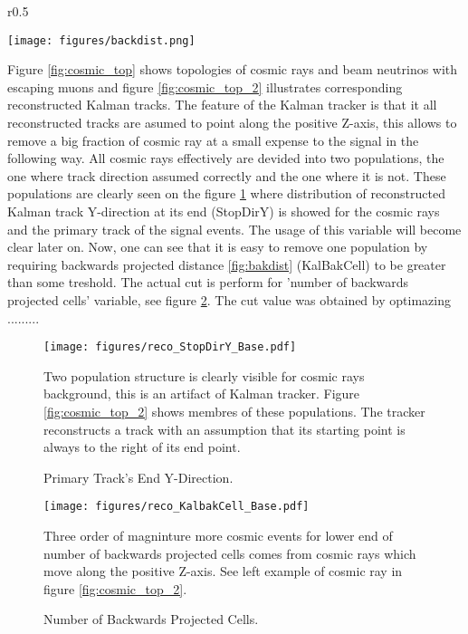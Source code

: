 \begin{wrapfigure}{r}{0.5\textwidth}
\vspace{-15pt}
  \begin{center}
    \texttt{[image: figures/backdist.png]}
  \end{center}
\vspace{0.5mm}
\caption{Backwards projected distance}
\label{fig:bakdist}
\end{wrapfigure}
Figure \ref{fig:cosmic_top} shows topologies of cosmic rays and beam neutrinos with escaping muons and figure
\ref{fig:cosmic_top_2} illustrates corresponding reconstructed Kalman tracks. The feature of the Kalman 
tracker is that it all reconstructed tracks are asumed to point along the positive Z-axis, this allows 
to remove a big fraction of cosmic ray at a small expense to the signal in the following way. All cosmic 
rays effectively are devided into two populations, the one where track direction assumed correctly and the 
one where it is not. These populations are clearly seen on the figure \ref{fig:stopdiry_1} where distribution
of reconstructed Kalman track Y-direction at its end (StopDirY) is showed for the cosmic rays and the primary 
track of the signal events. The usage of this variable will become clear later on. Now, one can see that it 
is easy to remove one population by requiring backwards projected distance \ref{fig:bakdist} (KalBakCell) to 
be greater than some treshold. The actual cut is perform for 'number of backwards projected cells' variable, 
see figure \ref{fig:kalbakcell}. The cut value was obtained by optimazing .........
\begin{figure}[h]
\centering
\texttt{[image: figures/reco\_StopDirY\_Base.pdf]}
\caption{Primary Track's End Y-Direction.}
{Two population structure is clearly visible for cosmic rays background, this is an artifact of Kalman tracker.
Figure \ref{fig:cosmic_top_2} shows membres of these populations. The tracker reconstructs a track with an assumption 
that its starting point is always to the right of its end point. }
\label{fig:stopdiry_1}
\end{figure}
\begin{figure}[h]
\centering
\texttt{[image: figures/reco\_KalbakCell\_Base.pdf]}
\caption{Number of Backwards Projected Cells.}
{Three order of magninture more cosmic events for lower end of number of backwards projected cells comes from cosmic 
rays which move along the positive Z-axis. See left example of cosmic ray in figure \ref{fig:cosmic_top_2}. }
\label{fig:kalbakcell}
\end{figure}

